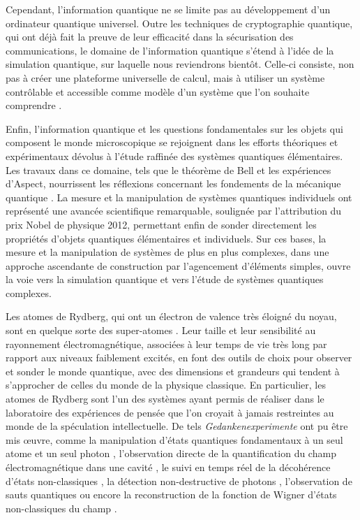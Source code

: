 Cependant, l'information quantique ne se limite pas au développement d'un ordinateur quantique universel.
Outre les techniques de cryptographie quantique, qui ont déjà fait la preuve de leur efficacité dans la sécurisation des communications, le domaine de l'information quantique s'étend à l'idée de la simulation quantique, sur laquelle nous reviendrons bientôt.
Celle-ci consiste, non pas à créer une plateforme universelle de calcul, mais à utiliser un système contrôlable et accessible comme modèle d'un système que l'on souhaite comprendre \cite{Feynman1982}.

Enfin, l'information quantique et les questions fondamentales sur les objets qui composent le monde microscopique se rejoignent dans les efforts théoriques et expérimentaux dévolus à l'étude raffinée des systèmes quantiques élémentaires.
Les travaux dans ce domaine, tels que le théorème de Bell et les expériences d'Aspect, nourrissent les réflexions concernant les fondements de la mécanique quantique \cite{QM_BELL64,QM_ASPECTGRANGIEREPR82,QM_ASPECTEPR82}.
La mesure et la manipulation de systèmes quantiques individuels ont représenté une avancée scientifique remarquable, soulignée par l'attribution du prix Nobel de physique 2012, permettant enfin de sonder directement les propriétés d'objets quantiques élémentaires et individuels.
Sur ces bases, la mesure et la manipulation de systèmes de plus en plus complexes, dans une approche ascendante de construction par l'agencement d'éléments simples, ouvre la voie vers la simulation quantique et vers l'étude de systèmes quantiques complexes.



\bigskip
Les atomes de Rydberg, qui ont un électron de valence très éloigné du noyau, sont en quelque sorte des \og super-atomes \fg{}. Leur taille et leur sensibilité au rayonnement électromagnétique, associées à leur temps de vie très long par rapport aux niveaux faiblement excités, en font des outils de choix pour observer et sonder le monde quantique, avec des dimensions et grandeurs qui tendent à s'approcher de celles du monde de la physique classique.
En particulier, les atomes de Rydberg sont l'un des systèmes ayant permis de réaliser dans le laboratoire des expériences de pensée que l'on croyait à jamais restreintes au monde de la spéculation intellectuelle.
De tels \textit{Gedankenexperimente} ont pu être mis \oe uvre, comme la manipulation d'états quantiques fondamentaux à un seul atome et un seul photon \cite{ENS_EXPTWOPHOTON},
l'observation directe de la quantification du champ électromagnétique dans une cavité \cite{ENS_QRABI},
le suivi en temps réel de la décohérence d'états non-classiques \cite{ENS_CAT,ENS_RMP},
la détection non-destructive de photons \cite{ENS_QND,ENS_COUNT05},
l'observation de sauts quantiques \cite{ENS_QNDZEROUN07,ENS_QNDCOLLAPSE07}
ou encore la reconstruction de la fonction de Wigner d'états non-classiques du champ \cite{ENS_FULLWIGNER08}.

